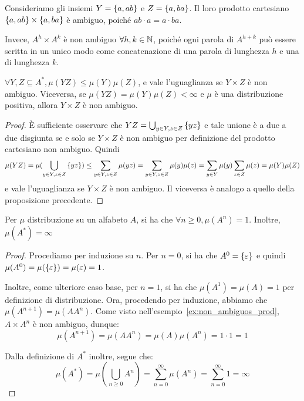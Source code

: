 \begin{example}\label{ex:non_ambiguos_prod}
  Consideriamo gli insiemi \(Y = \set{a,ab}\) e \(Z = \set{a,ba}\).
  Il loro prodotto cartesiano \(\set{a,ab}\times\set{a,ba}\) è ambiguo, poiché \(ab\cdot a = a\cdot ba\).

  Invece, \(A^h\times A^k\) è non ambiguo \(\forall h,k \in \mathbb{N}\), poiché ogni parola di \(A^{h+k}\) può essere scritta in un unico modo come concatenazione di una parola di lunghezza \(h\) e una di lunghezza \(k\).
\end{example}
\begin{proposition}\label{prop:distribution_distributivity_over_product}
  \(\forall Y,Z \subseteq A^*, \mu(YZ) \leq \mu(Y)\mu(Z)\), e vale l'uguaglianza se \(Y\times Z\) è non ambiguo.
  Viceversa, se \(\mu(YZ) = \mu(Y)\mu(Z) < \infty\) e \(\mu\) è una distribuzione positiva, allora \(Y\times Z\) è non ambiguo.
\end{proposition}
\begin{proof}
  È sufficiente osservare che \(YZ = \bigcup_{y\in Y, z \in Z}\set{yz}\) e tale unione è a due a due disgiunta se e solo se \(Y\times Z\) è non ambiguo per definizione del prodotto cartesiano non ambiguo.
  Quindi
  \[\mu(YZ) = \mu(\bigcup_{y\in Y, z \in Z}\set{yz}) \leq \sum_{y\in Y, z \in Z}\mu(yz) = \sum_{y\in Y, z \in Z}\mu(y)\mu(z) =\sum_{y \in Y}\mu(y) \sum_{z \in Z}\mu(z) = \mu(Y)\mu(Z)\]
  e vale l'uguaglianza se \(Y\times Z\) è non ambiguo.
  Il viceversa è analogo a quello della proposizione precedente.
\end{proof}

\begin{proposition}\label{prop:A_power_mesure_1}
  Per \(\mu\) distribuzione su un alfabeto \(A\), si ha che \(\forall n \geq 0, \mu(A^n) = 1\).
  Inoltre, \(\mu(A^*) = \infty\)
\end{proposition}
\begin{proof}
  Procediamo per induzione su \(n\).
  Per \(n=0\), si ha che \(A^0 = \set{\varepsilon}\) e quindi \(\mu(A^0) = \mu(\set{\varepsilon}) = \mu(\varepsilon) = 1\).

  Inoltre, come ulteriore caso base, per \(n=1\), si ha che \(\mu(A^1) = \mu(A) = 1\) per definizione di distribuzione.
  Ora, procedendo per induzione, abbiamo che \(\mu(A^{n+1}) = \mu(AA^n)\).
  Come visto nell'esempio~\ref{ex:non_ambiguos_prod}, \(A \times A^n\) è non ambiguo, dunque:
  \[\mu(A^{n+1}) = \mu(AA^n) = \mu(A)\mu(A^n) = 1 \cdot 1 = 1 \]

  Dalla definizione di \(A^*\) inoltre, segue che:
  \[\mu(A^*) = \mu(\bigcup_{n\geq0} A^n) = \sum_{n=0}^{\infty} \mu(A^n) = \sum_{n=0}^{\infty} 1 = \infty\]
\end{proof}

